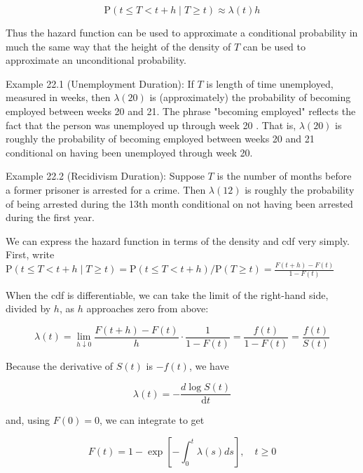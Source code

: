 \documentclass[10pt]{article}
\begin{document}
\begin{equation*}
\mathrm{P}(t \leq T<t+h \mid T \geq t) \approx \lambda(t) h \tag{22.4}
\end{equation*}


Thus the hazard function can be used to approximate a conditional probability in much the same way that the height of the density of $T$ can be used to approximate an unconditional probability.

Example 22.1 (Unemployment Duration): If $T$ is length of time unemployed, measured in weeks, then $\lambda(20)$ is (approximately) the probability of becoming employed between weeks 20 and 21. The phrase "becoming employed" reflects the fact that the person was unemployed up through week 20 . That is, $\lambda(20)$ is roughly the probability of becoming employed between weeks 20 and 21 conditional on having been unemployed through week 20.

Example 22.2 (Recidivism Duration): Suppose $T$ is the number of months before a former prisoner is arrested for a crime. Then $\lambda(12)$ is roughly the probability of being arrested during the 13th month conditional on not having been arrested during the first year.

We can express the hazard function in terms of the density and cdf very simply. First, write\\
$\mathrm{P}(t \leq T<t+h \mid T \geq t)=\mathrm{P}(t \leq T<t+h) / \mathrm{P}(T \geq t)=\frac{F(t+h)-F(t)}{1-F(t)}$

When the cdf is differentiable, we can take the limit of the right-hand side, divided by $h$, as $h$ approaches zero from above:


\begin{equation*}
\lambda(t)=\lim _{h \downarrow 0} \frac{F(t+h)-F(t)}{h} \cdot \frac{1}{1-F(t)}=\frac{f(t)}{1-F(t)}=\frac{f(t)}{S(t)} \tag{22.5}
\end{equation*}


Because the derivative of $S(t)$ is $-f(t)$, we have


\begin{equation*}
\lambda(t)=-\frac{d \log S(t)}{\mathrm{d} t} \tag{22.6}
\end{equation*}


and, using $F(0)=0$, we can integrate to get


\begin{equation*}
F(t)=1-\exp \left[-\int_{0}^{t} \lambda(s) d s\right], \quad t \geq 0 \tag{22.7}
\end{equation*}
\end{document}
